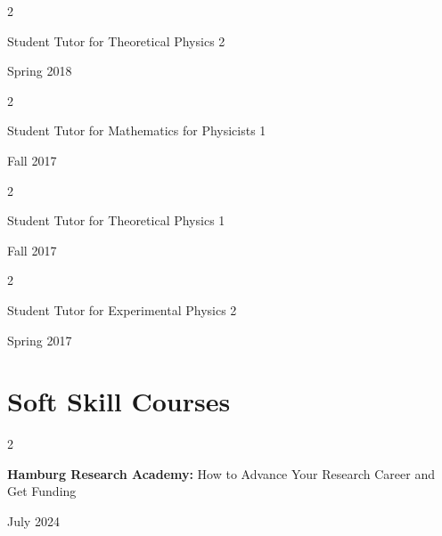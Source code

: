\documentclass[10pt, letterpaper]{article}
\newenvironment{twocolentry}[2][]{
    \onecolentry
    \def\secondColumn{#2}
    \setcolumnwidth{\fill, 4.5 cm}
    \begin{paracol}{2}
}{
    \switchcolumn \raggedleft \secondColumn
    \end{paracol}
    \endonecolentry
} %
\begin{document}
 \vspace{0.2cm}

  \begin{twocolentry}{

    Spring 2018
           
        }
           Student Tutor for Theoretical Physics 2
            
           
        \end{twocolentry}
        
 \vspace{0.2cm}

  \begin{twocolentry}{

    Fall 2017
           
        }
           Student Tutor for Mathematics for Physicists 1
            
           
        \end{twocolentry}
        
 \vspace{0.2cm}

 
  \begin{twocolentry}{

    Fall 2017
           
        }
           Student Tutor for Theoretical Physics 1
            
           
        \end{twocolentry}
        
 \vspace{0.2cm}

 
  \begin{twocolentry}{

    Spring 2017
           
        }
           Student Tutor for Experimental Physics 2
            
           
        \end{twocolentry}
        
 \vspace{0.2cm}


\section{Soft Skill Courses}

\begin{twocolentry}
{July 2024}
    \textbf{Hamburg Research Academy:} How to Advance Your Research Career and Get Funding 
\end{twocolentry}
\end{document}
